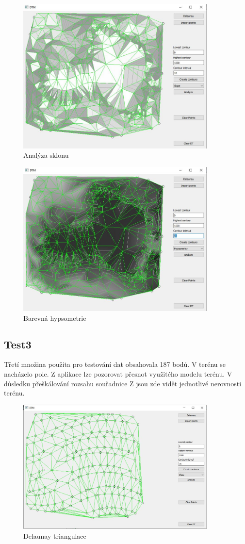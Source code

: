 \documentclass[a4paper, 12pt]{article}
\begin{document}
 \begin{figure}[h!]
	\centering
	\includegraphics[width=10cm]{test24.jpg}
	\caption{Analýza sklonu}
\end{figure}

 \begin{figure}[h!]
	\centering
	\includegraphics[width=10cm]{test25.jpg}
	\caption{Barevná hypsometrie}
\end{figure}

\clearpage

\subsection{Test3}
Třetí množina použita pro testování dat obsahovala 187 bodů. V terénu se nacházelo pole. Z aplikace lze pozorovat přesnot využitého modelu terénu. V důsledku přeškálování rozsahu souřadnice Z jsou zde vidět jednotlivé nerovnosti terénu. 

 \begin{figure}[h!]
	\centering
	\includegraphics[width=10cm]{test31.jpg}
	\caption{Delaunay triangulace}
\end{figure}
\end{document}
